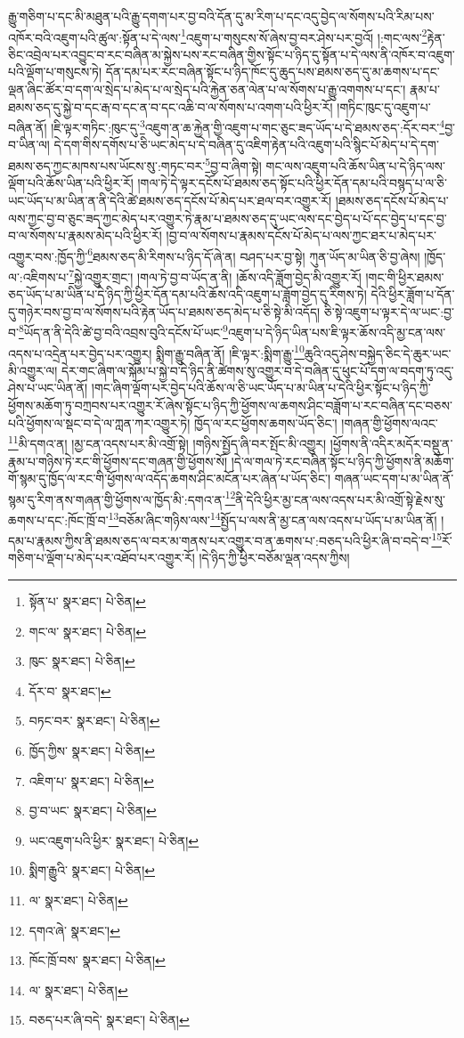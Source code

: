 རྒྱུ་གཅིག་པ་དང་མི་མཐུན་པའི་རྒྱུ་དགག་པར་བྱ་བའི་དོན་དུ་མ་རིག་པ་དང་འདུ་བྱེད་ལ་སོགས་པའི་རིམ་པས་འཁོར་བའི་འཇུག་པའི་ཚུལ་:སྟོན་པ་དེ་ལས་\footnote{སྟོན་པ་  སྣར་ཐང་།  པེ་ཅིན། }འཇུག་པ་གསུངས་སོ་ཞེས་བྱ་བར་ཤེས་པར་བྱའོ། །:གང་ལས་\footnote{གང་ལ་  སྣར་ཐང་།  པེ་ཅིན། }རྟེན་ཅིང་འབྲེལ་པར་འབྱུང་བ་རང་བཞིན་མ་སྐྱེས་པས་རང་བཞིན་གྱིས་སྟོང་པ་ཉིད་དུ་སྟོན་པ་དེ་ལས་ནི་འཁོར་བ་འཇུག་པའི་ལྡོག་པ་གསུངས་ཏེ། དོན་དམ་པར་རང་བཞིན་སྟོང་པ་ཉིད་ཁོང་དུ་ཆུད་པས་ཐམས་ཅད་དུ་མ་ཆགས་པ་དང་ལྡན་ཞིང་ཚོར་བ་དག་ལ་སྲེད་པ་མེད་པ་ལ་སྲེད་པའི་རྐྱེན་ཅན་ལེན་པ་ལ་སོགས་པ་རྒྱུ་འགགས་པ་དང་། རྣམ་པ་ཐམས་ཅད་དུ་སྐྱེ་བ་དང་རྒ་བ་དང་ན་བ་དང་འཆི་བ་ལ་སོགས་པ་འགག་པའི་ཕྱིར་རོ། །གཏིང་ཁུང་དུ་འཇུག་པ་བཞིན་ནོ། །ཇི་ལྟར་གཏིང་:ཁུང་དུ་\footnote{ཁུང་  སྣར་ཐང་།  པེ་ཅིན། }འཇུག་ན་ཆ་རྐྱེན་གྱི་འཇུག་པ་གང་ཅུང་ཟད་ཡོད་པ་དེ་ཐམས་ཅད་:དོར་བར་\footnote{དོར་བ་  སྣར་ཐང་། }བྱ་བ་ཡིན་ལ། དེ་དག་གིས་དགོས་པ་ཅི་ཡང་མེད་པ་དེ་བཞིན་དུ་འཇིག་རྟེན་པའི་འཇུག་པའི་སྙིང་པོ་མེད་པ་དེ་དག་ཐམས་ཅད་ཀྱང་མཁས་པས་ཡོངས་སུ་:གཏང་བར་\footnote{བཏང་བར་  སྣར་ཐང་།  པེ་ཅིན། }བྱ་བ་ཞིག་སྟེ། གང་ལས་འཇུག་པའི་ཆོས་ཡིན་པ་དེ་ཉིད་ལས་ལྡོག་པའི་ཆོས་ཡིན་པའི་ཕྱིར་རོ། །གལ་ཏེ་དེ་ལྟར་དངོས་པོ་ཐམས་ཅད་སྟོང་པའི་ཕྱིར་དོན་དམ་པའི་བསྙད་པ་ལ་ཅི་ཡང་ཡོད་པ་མ་ཡིན་ན་ནི་དེའི་ཚེ་ཐམས་ཅད་དངོས་པོ་མེད་པར་ཐལ་བར་འགྱུར་རོ། །ཐམས་ཅད་དངོས་པོ་མེད་པ་ལས་ཀྱང་བྱ་བ་ཅུང་ཟད་ཀྱང་མེད་པར་འགྱུར་ཏེ་རྣམ་པ་ཐམས་ཅད་དུ་ཡང་ལས་དང་བྱེད་པ་པོ་དང་བྱེད་པ་དང་བྱ་བ་ལ་སོགས་པ་རྣམས་མེད་པའི་ཕྱིར་རོ། །བྱ་བ་ལ་སོགས་པ་རྣམས་དངོས་པོ་མེད་པ་ལས་ཀྱང་ཐར་པ་མེད་པར་འགྱུར་བས་:ཁྱོད་ཀྱི་\footnote{ཁྱོད་ཀྱིས་  སྣར་ཐང་།  པེ་ཅིན། }ཐམས་ཅད་མི་རིགས་པ་ཉིད་དོ་ཞེ་ན། བཤད་པར་བྱ་སྟེ། ཀུན་ཡོད་མ་ཡིན་ཅི་བྱ་ཞེས། །ཁྱོད་ལ་:འཇིགས་པ་\footnote{འཇིག་པ་  སྣར་ཐང་།  པེ་ཅིན། }སྐྱེ་འགྱུར་གྲང་། །གལ་ཏེ་བྱ་བ་ཡོད་ན་ནི། །ཆོས་འདི་ཟློག་བྱེད་མི་འགྱུར་རོ། །གང་གི་ཕྱིར་ཐམས་ཅད་ཡོད་པ་མ་ཡིན་པ་དེ་ཉིད་ཀྱི་ཕྱིར་དོན་དམ་པའི་ཆོས་འདི་འཇུག་པ་ཟློག་བྱེད་དུ་རིགས་ཏེ། དེའི་ཕྱིར་ཟློག་པ་དོན་དུ་གཉེར་བས་བྱ་བ་ལ་སོགས་པའི་རྟེན་ཡོད་པ་ཐམས་ཅད་མེད་པ་ཅི་སྟེ་མི་འདོད། ཅི་སྟེ་འཇུག་པ་ལྟར་དེ་ལ་ཡང་:བྱ་བ་\footnote{བྱ་བ་ཡང་  སྣར་ཐང་།  པེ་ཅིན། }ཡོད་ན་ནི་དེའི་ཚེ་བྱ་བའི་འབྲས་བུའི་དངོས་པོ་ཡང་\footnote{ཡང་འཇུག་པའི་ཕྱིར་  སྣར་ཐང་།  པེ་ཅིན། }འཇུག་པ་དེ་ཉིད་ཡིན་པས་ཇི་ལྟར་ཆོས་འདི་མྱ་ངན་ལས་འདས་པ་འདྲེན་པར་བྱེད་པར་འགྱུར། སྨིག་རྒྱུ་བཞིན་ནོ། །ཇི་ལྟར་:སྨིག་རྒྱུ་\footnote{སྨིག་རྒྱུའི་  སྣར་ཐང་།  པེ་ཅིན། }ཆུའི་འདུ་ཤེས་བསྐྱེད་ཅིང་དེ་ཆུར་ཡང་མི་འགྱུར་ལ། དེར་གང་ཞིག་ལ་སྐོམ་པ་སྐྱེ་བ་དེ་ཉིད་ནི་ཚེགས་སུ་འགྱུར་བ་དེ་བཞིན་དུ་ཕུང་པོ་དག་ལ་བདག་ཏུ་འདུ་ཤེས་པ་ཡང་ཡིན་ནོ། །གང་ཞིག་ལྡོག་པར་བྱེད་པའི་ཆོས་ལ་ཅི་ཡང་ཡོད་པ་མ་ཡིན་པ་དེའི་ཕྱིར་སྟོང་པ་ཉིད་ཀྱི་ཕྱོགས་མཆོག་ཏུ་བཀྲབས་པར་འགྱུར་རོ་ཞེས་སྟོང་པ་ཉིད་ཀྱི་ཕྱོགས་ལ་ཆགས་ཤིང་བཟློག་པ་རང་བཞིན་དང་བཅས་པའི་ཕྱོགས་ལ་སྡང་བ་དེ་ལ་ཀླན་ཀར་འགྱུར་ཏེ། ཁྱོད་ལ་རང་ཕྱོགས་ཆགས་ཡོད་ཅིང་། །གཞན་གྱི་ཕྱོགས་ལའང་\footnote{ལ་  སྣར་ཐང་།  པེ་ཅིན། }མི་དགའ་ན། །མྱ་ངན་འདས་པར་མི་འགྲོ་སྟེ། །གཉིས་སྤྱོད་ཞི་བར་སྤོང་མི་འགྱུར། །ཕྱོགས་ནི་འདིར་མདོར་བསྡུ་ན་རྣམ་པ་གཉིས་ཏེ་རང་གི་ཕྱོགས་དང་གཞན་གྱི་ཕྱོགས་སོ། །དེ་ལ་གལ་ཏེ་རང་བཞིན་སྟོང་པ་ཉིད་ཀྱི་ཕྱོགས་ནི་མཆོག་གོ་སྙམ་དུ་ཁྱོད་ལ་རང་གི་ཕྱོགས་ལ་འདོད་ཆགས་ཤིང་མངོན་པར་ཞེན་པ་ཡོད་ཅིང་། གཞན་ཡང་དག་པ་མ་ཡིན་ནོ་སྙམ་དུ་རིག་ནས་གཞན་གྱི་ཕྱོགས་ལ་ཁྱོད་མི་:དགའ་ན་\footnote{དགའ་ཞེ་  སྣར་ཐང་། }ནི་དེའི་ཕྱིར་མྱ་ངན་ལས་འདས་པར་མི་འགྲོ་སྟེ་རྗེས་སུ་ཆགས་པ་དང་:ཁོང་ཁྲོ་བ་\footnote{ཁོང་ཁྲོ་བས་  སྣར་ཐང་།  པེ་ཅིན། }བཅོམ་ཞིང་གཉིས་ལས་\footnote{ལ་  སྣར་ཐང་།  པེ་ཅིན། }སྤྱོད་པ་ལས་ནི་མྱ་ངན་ལས་འདས་པ་ཡོད་པ་མ་ཡིན་ནོ། །དམ་པ་རྣམས་ཀྱིས་ནི་ཐམས་ཅད་ལ་བར་མ་གནས་པར་འགྱུར་བ་ན་ཆགས་པ་:བཅད་པའི་ཕྱིར་ཞི་བ་བདེ་བ་\footnote{བཅད་པར་ཞི་བདེ་  སྣར་ཐང་།  པེ་ཅིན། }རོ་གཅིག་པ་ལྡོག་པ་མེད་པར་འཐོབ་པར་འགྱུར་རོ། །དེ་ཉིད་ཀྱི་ཕྱིར་བཅོམ་ལྡན་འདས་ཀྱིས། 